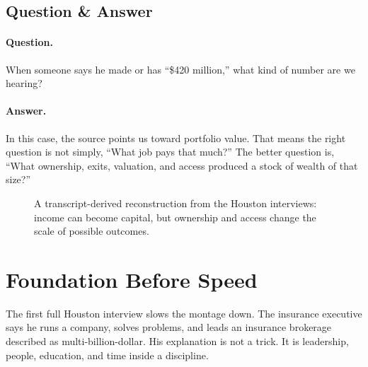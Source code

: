 \documentclass[11pt,oneside]{book}
\begin{document}
\subsection{Question \& Answer}

\paragraph{Question.}
When someone says he made or has ``\$420 million,'' what kind of number are we hearing?

\paragraph{Answer.}
In this case, the source points us toward portfolio value. That means the right question is not simply, ``What job pays that much?'' The better question is, ``What ownership, exits, valuation, and access produced a stock of wealth of that size?''

\begin{figure}
\centering
{}
\caption{A transcript-derived reconstruction from the Houston interviews: income can become capital, but ownership and access change the scale of possible outcomes.}
\end{figure}

\section{Foundation Before Speed}

The first full Houston interview slows the montage down. The insurance executive says he runs a company, solves problems, and leads an insurance brokerage described as multi-billion-dollar. His explanation is not a trick. It is leadership, people, education, and time inside a discipline.
\end{document}
